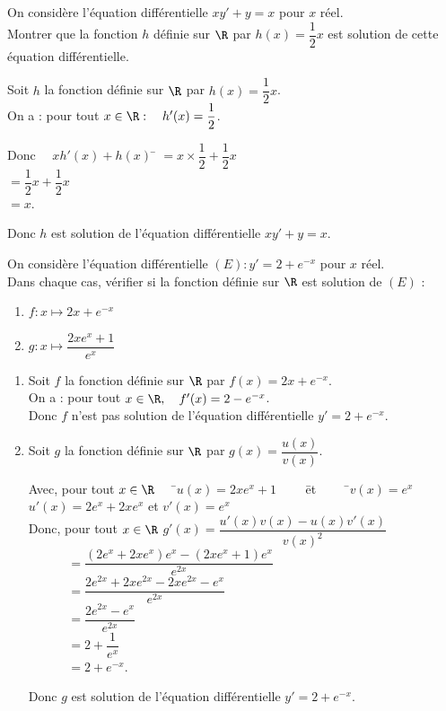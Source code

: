 \documentclass[a4paper,11pt,exos]{nsi} %
\begin{document}
\exo{}
On considère l'équation différentielle $xy'+y = x$ pour $x$ réel.\\
Montrer que la fonction $h$ définie sur $\R$ par $h(x)=\dfrac{1}{2}x$ est solution de cette équation différentielle.\\

\textcolor{UGLiBlue}{
    Soit $h$ la fonction définie sur $\R$ par $h(x)=\dfrac{1}{2}x$.\\
    On a : pour tout $x\in\R : \quad h'(x)=\dfrac{1}{2}$.
    \begin{tabbing}
        Donc $\quad xh'(x)+h(x)$ \= $= x\times\dfrac{1}{2}+\dfrac{1}{2}x$\\
        \> $=\dfrac{1}{2}x+\dfrac{1}{2}x$\\
        \> $=x$.
    \end{tabbing}
    Donc $h$ est solution de l'équation différentielle $xy'+y=x$.
}

\exo{}
On considère l'équation différentielle $(E) : y' = 2+e^{-x}$ pour $x$ réel.\\
Dans chaque cas, vérifier si la fonction définie sur $\R$ est solution de $(E)$ :
\begin{multicols}{2}
    \begin{enumerate}
        \item $f:x\mapsto 2x+e^{-x}$
        \item $g:x\mapsto \dfrac{2xe^x+1}{e^x}$
    \end{enumerate}
\end{multicols}

\textcolor{UGLiBlue}{
    \begin{enumerate}
        \item Soit $f$ la fonction définie sur $\R$ par $f(x)=2x+e^{-x}$.\\
        On a : pour
        tout $x\in\R, \quad f'(x)=2-e^{-x}$.\\
        Donc $f$ n'est pas solution de l'équation différentielle $y'=2+e^{-x}$.
        \item Soit $g$ la fonction définie sur $\R$ par $g(x)=\dfrac{u(x)}{v(x)}$.
        \begin{tabbing}
            Avec, pour tout $x\in\R$ $\quad$ \=$u(x)=2xe^x+1\qquad$ \= et $\qquad$ \=$ v(x)=e^x$\\
            \> $u'(x)=2e^x+2xe^x$ \> et \> $v'(x)=e^x$\\[1em]
            Donc, pour tout $x\in\R$ \> $g'(x)=\dfrac{u'(x)v(x)-u(x)v'(x)}{v(x)^2}$\\[.5em]
            \> $\phantom{g'(x)}=\dfrac{(2e^x+2xe^x)e^x-(2xe^x+1)e^x}{e^{2x}}$\\[.5em]
            \> $\phantom{g'(x)}=\dfrac{2e^{2x}+2xe^{2x}-2xe^{2x}-e^{x}}{e^{2x}}$\\[.5em]
            \> $\phantom{g'(x)}=\dfrac{2e^{2x}-e^x}{e^{2x}}$\\[.5em]
            \> $\phantom{g'(x)}=2+\dfrac{1}{e^x}$\\[.5em]
            \> $\phantom{g'(x)}=2+e^{-x}$.
        \end{tabbing}
        Donc $g$ est solution de l'équation différentielle $y'=2+e^{-x}$.
    \end{enumerate}
}
\end{document}
